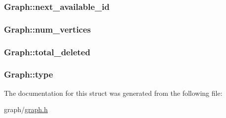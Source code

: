 \subsubsection[{\texorpdfstring{next\+\_\+available\+\_\+id}{next_available_id}}]{ Graph\+::next\+\_\+available\+\_\+id}\hypertarget{structGraph_a71ca04f6b8639cb3c584814d50a04551}{}\label{structGraph_a71ca04f6b8639cb3c584814d50a04551}
\subsubsection[{\texorpdfstring{num\+\_\+vertices}{num_vertices}}]{ Graph\+::num\+\_\+vertices}\hypertarget{structGraph_a2ee8e26d64bc65ec8df12199817f36ee}{}\label{structGraph_a2ee8e26d64bc65ec8df12199817f36ee}
\subsubsection[{\texorpdfstring{total\+\_\+deleted}{total_deleted}}]{ Graph\+::total\+\_\+deleted}\hypertarget{structGraph_adc026c1f3e912191160738438900f1cf}{}\label{structGraph_adc026c1f3e912191160738438900f1cf}
\subsubsection[{\texorpdfstring{type}{type}}]{ Graph\+::type}\hypertarget{structGraph_aa2ea9bdb6f466f17184c42a2dbca068f}{}\label{structGraph_aa2ea9bdb6f466f17184c42a2dbca068f}


The documentation for this struct was generated from the following file\+:\begin{DoxyCompactItemize}
\item 
graph/\hyperlink{graph_8h}{graph.\+h}\end{DoxyCompactItemize}
